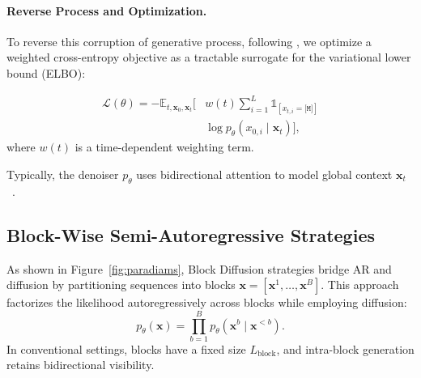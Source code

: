 \documentclass[11pt]{article}
\begin{document}
\paragraph{Reverse Process and Optimization.}
To reverse this corruption of generative process, following \citet{ye2025dream}, we optimize a weighted cross-entropy objective as a tractable surrogate for the variational lower bound (ELBO):

\begin{equation}
\begin{aligned}
    \mathcal{L}(\theta) = -\mathbb{E}_{t, \mathbf{x}_0, \mathbf{x}_t} \bigg[ & w(t) \sum_{i=1}^L \mathbb{1}_{[x_{t,i}=\texttt{[M]}]} \\
    & \log p_\theta(x_{0,i} \mid \mathbf{x}_t) \bigg],
\end{aligned}
\label{eq:dream_loss}
\end{equation}
where $w(t)$ is a time-dependent weighting term.

Typically, the denoiser $p_\theta$ uses bidirectional attention to model global context $\mathbf{x}_t$~\cite{ye2025dream}.

\subsection{Block-Wise Semi-Autoregressive Strategies}
\label{ssec:block_diffusion}

As shown in Figure~\ref{fig:paradiams}, Block Diffusion strategies \cite{BlockDiffusion} bridge AR and diffusion by partitioning sequences into blocks $\mathbf{x} = [\mathbf{x}^1, \dots, \mathbf{x}^B]$. This approach factorizes the likelihood autoregressively across blocks while employing diffusion:
\begin{equation}
    p_\theta(\mathbf{x}) = \prod_{b=1}^B p_\theta(\mathbf{x}^b \mid \mathbf{x}^{<b}).
\end{equation}
In conventional settings, blocks have a fixed size $L_{\text{block}}$, and intra-block generation retains bidirectional visibility.
\end{document}
